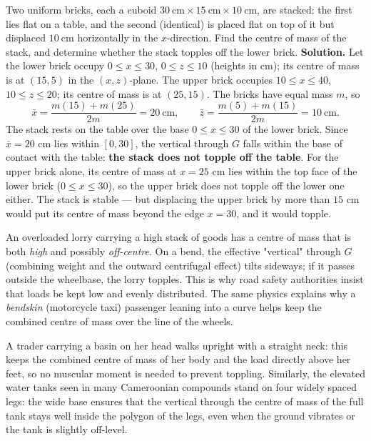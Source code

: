 \documentclass[11pt]{article}
\begin{document}
\begin{exoresolu}
Two uniform bricks, each a cuboid $30\ \mathrm{cm} \times 15\ \mathrm{cm} \times 10\ \mathrm{cm}$, are stacked: the first lies flat on a table, and the second (identical) is placed flat on top of it but displaced $10\ \mathrm{cm}$ horizontally in the $x$-direction. Find the centre of mass of the stack, and determine whether the stack topples off the lower brick.
\tcblower
\textbf{Solution.} Let the lower brick occupy $0 \le x \le 30$, $0 \le z \le 10$ (heights in cm); its centre of mass is at $(15, 5)$ in the $(x,z)$-plane. The upper brick occupies $10 \le x \le 40$, $10 \le z \le 20$; its centre of mass is at $(25, 15)$. The bricks have equal mass $m$, so
\[ \bar{x} = \frac{m(15) + m(25)}{2m} = 20\ \mathrm{cm}, \qquad \bar{z} = \frac{m(5) + m(15)}{2m} = 10\ \mathrm{cm}. \]
The stack rests on the table over the base $0 \le x \le 30$ of the lower brick. Since $\bar{x} = 20$ cm lies within $[0, 30]$, the vertical through $G$ falls within the base of contact with the table: \textbf{the stack does not topple off the table}. For the upper brick alone, its centre of mass at $x = 25$ cm lies within the top face of the lower brick ($0 \le x \le 30$), so the upper brick does not topple off the lower one either. The stack is stable — but displacing the upper brick by more than $15$ cm would put its centre of mass beyond the edge $x = 30$, and it would topple.
\end{exoresolu}

\begin{savaistu}
An overloaded lorry carrying a high stack of goods has a centre of mass that is both \emph{high} and possibly \emph{off-centre}. On a bend, the effective "vertical" through $G$ (combining weight and the outward centrifugal effect) tilts sideways; if it passes outside the wheelbase, the lorry topples. This is why road safety authorities insist that loads be kept low and evenly distributed. The same physics explains why a \emph{bendskin} (motorcycle taxi) passenger leaning into a curve helps keep the combined centre of mass over the line of the wheels.
\end{savaistu}

\begin{savaistu}
A trader carrying a basin on her head walks upright with a straight neck: this keeps the combined centre of mass of her body and the load directly above her feet, so no muscular moment is needed to prevent toppling. Similarly, the elevated water tanks seen in many Cameroonian compounds stand on four widely spaced legs: the wide base ensures that the vertical through the centre of mass of the full tank stays well inside the polygon of the legs, even when the ground vibrates or the tank is slightly off-level.
\end{savaistu}
\end{document}
